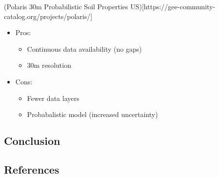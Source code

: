 \documentclass[
]{agujournal2019}
\providecommand{\tightlist}{%
  \setlength{\itemsep}{0pt}\setlength{\parskip}{0pt}}\usepackage{longtable,booktabs,array}
\begin{document}
(Polaris 30m Probabilistic Soil Properties
US){[}https://gee-community-catalog.org/projects/polaris/{]}

\begin{itemize}
\tightlist
\item
  Pros:

  \begin{itemize}
  \tightlist
  \item
    Continuous data availability (no gaps)
  \item
    30m resolution
  \end{itemize}
\item
  Cons:

  \begin{itemize}
  \tightlist
  \item
    Fewer data layers
  \item
    Probabalistic model (increased uncertainty)
  \end{itemize}
\end{itemize}

\subsection{Conclusion}\label{sec-conclusions}

\subsection*{References}\label{references}
\end{document}
